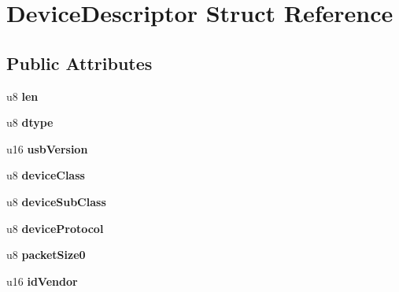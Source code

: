 \hypertarget{struct_device_descriptor}{}\section{Device\+Descriptor Struct Reference}
\label{struct_device_descriptor}
\subsection*{Public Attributes}
\begin{DoxyCompactItemize}
\item 
\hypertarget{struct_device_descriptor_a8b86e2bfea757362b072d295be2380bd}{}u8 {\bfseries len}\label{struct_device_descriptor_a8b86e2bfea757362b072d295be2380bd}

\item 
\hypertarget{struct_device_descriptor_ab655df95ff64dfe37061bb4d428b82c6}{}u8 {\bfseries dtype}\label{struct_device_descriptor_ab655df95ff64dfe37061bb4d428b82c6}

\item 
\hypertarget{struct_device_descriptor_a8f922d8b2a0d01aa88490ef96526d4a0}{}u16 {\bfseries usb\+Version}\label{struct_device_descriptor_a8f922d8b2a0d01aa88490ef96526d4a0}

\item 
\hypertarget{struct_device_descriptor_aee41525162e53aa3599d35d1193ce09e}{}u8 {\bfseries device\+Class}\label{struct_device_descriptor_aee41525162e53aa3599d35d1193ce09e}

\item 
\hypertarget{struct_device_descriptor_a1059294ddec656c621063df40b5f5821}{}u8 {\bfseries device\+Sub\+Class}\label{struct_device_descriptor_a1059294ddec656c621063df40b5f5821}

\item 
\hypertarget{struct_device_descriptor_a65299050c896a011ff47770d7c7b16ba}{}u8 {\bfseries device\+Protocol}\label{struct_device_descriptor_a65299050c896a011ff47770d7c7b16ba}

\item 
\hypertarget{struct_device_descriptor_ae76e33e00fdb69440bbc8ebc2ad294ec}{}u8 {\bfseries packet\+Size0}\label{struct_device_descriptor_ae76e33e00fdb69440bbc8ebc2ad294ec}

\item 
\hypertarget{struct_device_descriptor_a0fc95df092a03ecc59b097c110cc5d90}{}u16 {\bfseries id\+Vendor}\label{struct_device_descriptor_a0fc95df092a03ecc59b097c110cc5d90}


\end{DoxyCompactItemize}
